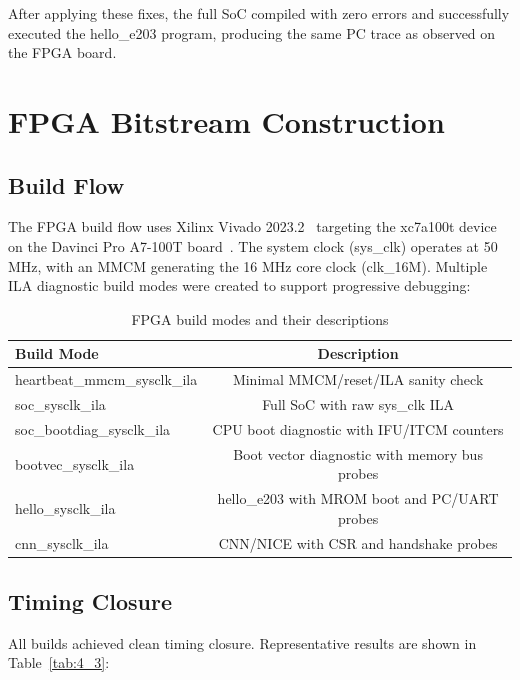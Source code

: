 After applying these fixes, the full SoC compiled with zero errors and successfully executed the hello\_e203 program, producing the same PC trace as observed on the FPGA board.


\section{FPGA Bitstream Construction}\label{sec:4_2}

\subsection{Build Flow}

The FPGA build flow uses Xilinx Vivado 2023.2~\cite{XILINX_UG908} targeting the \mbox{xc7a100t} device on the Davinci Pro A7-100T board~\cite{ALIENTEK_DAVINCI}. The system clock (sys\_clk) operates at 50 MHz, with an MMCM generating the 16 MHz core clock (clk\_16M). Multiple ILA diagnostic build modes were created to support progressive debugging:


\begin{table}[htbp]
\centering
\caption{FPGA build modes and their descriptions}
\label{tab:4_2}
\begin{tabular}{lc}
\hline
Build Mode & Description \\ \hline\hline
heartbeat\_mmcm\_sysclk\_ila & Minimal MMCM/reset/ILA sanity check \\ \hline
soc\_sysclk\_ila & Full SoC with raw sys\_clk ILA \\ \hline
soc\_bootdiag\_sysclk\_ila & CPU boot diagnostic with IFU/ITCM counters \\ \hline
bootvec\_sysclk\_ila & Boot vector diagnostic with memory bus probes \\ \hline
hello\_sysclk\_ila & hello\_e203 with MROM boot and PC/UART probes \\ \hline
cnn\_sysclk\_ila & CNN/NICE with CSR and handshake probes \\ \hline
\end{tabular}
\end{table}

\subsection{Timing Closure}

All builds achieved clean timing closure. Representative results are shown in Table~\ref{tab:4_3}:


